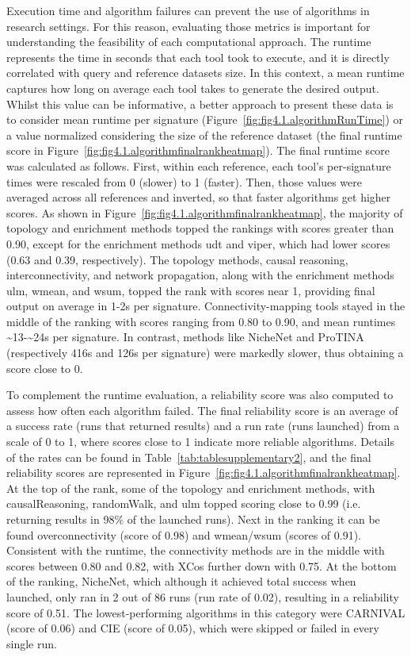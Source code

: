 Execution time and algorithm failures can prevent the use of algorithms in research settings.
For this reason, evaluating those metrics is important for understanding the feasibility of each computational approach.
The runtime represents the time in seconds that each tool took to execute, and it is directly correlated with query and reference datasets size.
In this context, a mean runtime captures how long on average each tool takes to generate the desired output.
Whilst this value can be informative, a better approach to present these data is to consider mean runtime per signature (Figure~\ref{fig:fig4.1.algorithmRunTime}) or a value normalized considering the size of the reference dataset (the final runtime score in Figure~\ref{fig:fig4.1.algorithmfinalrankheatmap}).
The final runtime score was calculated as follows. First, within each reference, each tool's per-signature times were rescaled from 0 (slower) to 1 (faster).
Then, those values were averaged across all references and inverted, so that faster algorithms get higher scores. As shown in Figure~\ref{fig:fig4.1.algorithmfinalrankheatmap}, the majority of topology and enrichment methods topped the rankings with scores greater than 0.90, except for the enrichment methods udt and viper, which had lower scores (0.63 and 0.39, respectively).
The topology methods, causal reasoning, interconnectivity, and network propagation, along with the enrichment methods ulm, wmean, and wsum, topped the rank with scores near 1, providing final output on average in 1-2s per signature.
Connectivity-mapping tools stayed in the middle of the ranking with scores ranging from 0.80 to 0.90, and mean runtimes \textasciitilde13-\textasciitilde24s per signature.
In contrast, methods like NicheNet and \gls{ProTINA} (respectively 416s and 126s per signature) were markedly slower, thus obtaining a score close to 0.

To complement the runtime evaluation, a reliability score was also computed to assess how often each algorithm failed.
The final reliability score is an average of a success rate (runs that returned results) and a run rate (runs launched) from a scale of 0 to 1, where scores close to 1 indicate more reliable algorithms.
Details of the rates can be found in Table~\ref{tab:tablesupplementary2}, and the final reliability scores are represented in Figure~\ref{fig:fig4.1.algorithmfinalrankheatmap}.
At the top of the rank, some of the topology and enrichment methods, with causalReasoning, randomWalk, and ulm topped scoring close to 0.99 (i.e. returning results in 98\% of the launched runs).
Next in the ranking it can be found overconnectivity (score of 0.98) and wmean/wsum (scores of 0.91).
Consistent with the runtime, the connectivity methods are in the middle with scores between 0.80 and 0.82, with XCos further down with 0.75.
At the bottom of the ranking, NicheNet, which although it achieved total success when launched, only ran in 2 out of 86 runs (run rate of 0.02), resulting in a reliability score of 0.51.
The lowest-performing algorithms in this category were \gls{CARNIVAL} (score of 0.06) and \gls{CIE} (score of 0.05), which were skipped or failed in every single run. 

